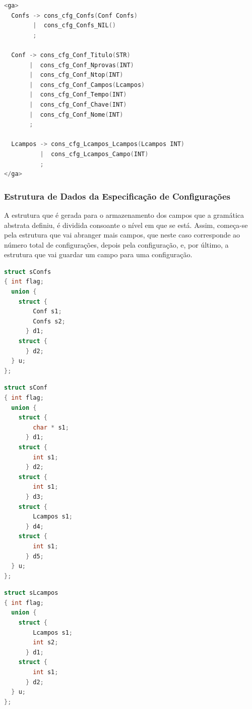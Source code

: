 \documentclass[11pt, a4paper, oneside]{article}
\begin{document}
\begin{lstlisting}[language=C, caption={Gramática abstrata utilizada pelo \emph{GABS}}]
<ga>
  Confs -> cons_cfg_Confs(Conf Confs)
        |  cons_cfg_Confs_NIL()
        ;

  Conf -> cons_cfg_Conf_Titulo(STR)
       |  cons_cfg_Conf_Nprovas(INT)
       |  cons_cfg_Conf_Ntop(INT)
       |  cons_cfg_Conf_Campos(Lcampos)
       |  cons_cfg_Conf_Tempo(INT)
       |  cons_cfg_Conf_Chave(INT)
       |  cons_cfg_Conf_Nome(INT)
       ;

  Lcampos -> cons_cfg_Lcampos_Lcampos(Lcampos INT)
          |  cons_cfg_Lcampos_Campo(INT)
          ;
</ga>
\end{lstlisting}

\subsubsection{Estrutura de Dados da Especificação de Configurações}
A estrutura que é gerada para o armazenamento dos campos que a gramática abstrata definiu, é dividida consoante o nível em que se está. Assim, começa-se pela estrutura que vai abranger mais campos, que neste caso corresponde ao número total de configurações, depois pela configuração, e, por último, a estrutura que vai guardar um campo para uma configuração.

\begin{lstlisting}[language=C, caption={Estrutura de dados para armazenar as configurações.}]
struct sConfs 
{ int flag;
  union {  
    struct {
        Conf s1;
        Confs s2;
      } d1;
    struct {
      } d2;
  } u;
};
\end{lstlisting}
\newpage
\begin{lstlisting}[language=C, caption={Estrutura de dados que armazena uma configuração.}]
struct sConf 
{ int flag;
  union {  
    struct {
        char * s1;
      } d1;
    struct {
        int s1;
      } d2;
    struct {
        int s1;
      } d3;
    struct {
        Lcampos s1;
      } d4;
    struct {
        int s1;
      } d5;
  } u;
};
\end{lstlisting}

\begin{lstlisting}[language=C, caption={Estrututura de dados que armazena os campos de uma configuração.}]
struct sLcampos 
{ int flag;
  union {  
    struct {
        Lcampos s1;
        int s2;
      } d1;
    struct {
        int s1;
      } d2;
  } u;
};
\end{lstlisting}
\end{document}
